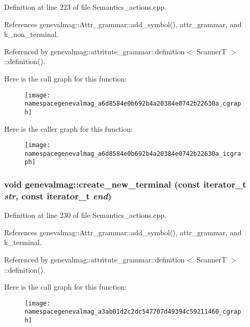 Definition at line 223 of file Semantics\_\-actions.cpp.



References genevalmag::Attr\_\-grammar::add\_\-symbol(), attr\_\-grammar, and k\_\-non\_\-terminal.



Referenced by genevalmag::attritute\_\-grammar::definition$<$ ScannerT $>$::definition().



Here is the call graph for this function:\nopagebreak
\begin{figure}[H]
\begin{center}
\leavevmode
\texttt{[image: namespacegenevalmag\_a6d8584e0b692b4a20384e0742b22630a\_cgraph]}
\end{center}
\end{figure}




Here is the caller graph for this function:\nopagebreak
\begin{figure}[H]
\begin{center}
\leavevmode
\texttt{[image: namespacegenevalmag\_a6d8584e0b692b4a20384e0742b22630a\_icgraph]}
\end{center}
\end{figure}


\hypertarget{namespacegenevalmag_a3ab01d2c2dc547707d49394c59211460}{
\subsubsection[{create\_\-new\_\-terminal}]{\setlength{\rightskip}{0pt plus 5cm}void genevalmag::create\_\-new\_\-terminal (const iterator\_\-t {\em str}, \/  const iterator\_\-t {\em end})}}
\label{namespacegenevalmag_a3ab01d2c2dc547707d49394c59211460}


Definition at line 230 of file Semantics\_\-actions.cpp.



References genevalmag::Attr\_\-grammar::add\_\-symbol(), attr\_\-grammar, and k\_\-terminal.



Referenced by genevalmag::attritute\_\-grammar::definition$<$ ScannerT $>$::definition().



Here is the call graph for this function:\nopagebreak
\begin{figure}[H]
\begin{center}
\leavevmode
\texttt{[image: namespacegenevalmag\_a3ab01d2c2dc547707d49394c59211460\_cgraph]}
\end{center}
\end{figure}




